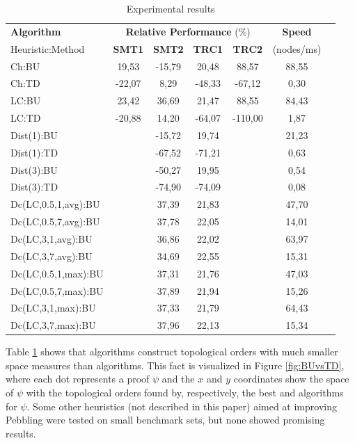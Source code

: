 \documentclass{llncs}
\begin{document}
\begin{table}
\centering
\setlength{\tabcolsep}{8pt}
\begin{tabular}{|l|c|c|c|c|c|c}
\hline
\textbf{Algorithm} & \multicolumn{4}{c|}{\textbf{Relative Performance} (\%)} & \textbf{Speed}\\ 
Heuristic:Method & \textbf{SMT1} & \textbf{SMT2} & \textbf{TRC1} & \textbf{TRC2} & (nodes/ms)\\ 
\hline\hline
Ch:BU & 19,53 & -15,79 & 20,48 & 88,57 & 88,55 \\ \hline
Ch:TD & -22,07 & 8,29 & -48,33 & -67,12 & 0,30 \\ \hline
LC:BU & 23,42 & 36,69 & 21,47 & 88,55 & 84,43 \\ \hline
LC:TD & -20,88 & 14,20 & -64,07 & -110,00 & 1,87 \\ \hline
Dist(1):BU & & -15,72 & 19,74 & & 21,23 \\ \hline
Dist(1):TD & & -67,52 & -71,21 & & 0,63 \\ \hline
Dist(3):BU & & -50,27 & 19,95 & & 0,54\\ \hline
Dist(3):TD & & -74,90 & -74,09 & & 0,08\\ \hline
Dc(LC,0.5,1,avg):BU & & 37,39 & 21,83 &  & 47,70\\ \hline
Dc(LC,0.5,7,avg):BU & & 37,78 & 22,05 &  & 14,01 \\ \hline
Dc(LC,3,1,avg):BU & & 36,86 & 22,02 &  & 63,97\\ \hline
Dc(LC,3,7,avg):BU & & 34,69 & 22,55 &  & 15,31 \\ \hline
Dc(LC,0.5,1,max):BU & & 37,31 & 21,76 &  & 47,03 \\ \hline
Dc(LC,0.5,7,max):BU & & 37,89 & 21,94 &  & 15,26 \\ \hline
Dc(LC,3,1,max):BU & & 37,33 & 21,79 &  & 64,43 \\ \hline
Dc(LC,3,7,max):BU & & 37,96 & 22,13 & & 15,34 \\
\hline
\end{tabular}
\caption{Experimental results}
\label{tab:results}
\end{table}


\noindent
Table \ref{tab:results} shows that  algorithms construct topological orders with much smaller space measures than  algorithms. This fact is visualized in Figure \ref{fig:BUvsTD}, where each dot represents a proof $\psi$ and the $x$ and $y$ coordinates show the space of $\psi$ with the topological orders found by, respectively, the best  and  algorithms for $\psi$. Some other heuristics (not described in this paper) aimed at improving  Pebbling were tested on small benchmark sets, but none showed promising results.
\end{document}
